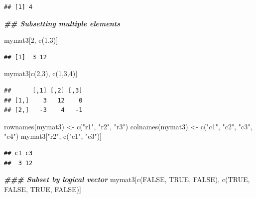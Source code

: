 \documentclass[
]{book}
\newenvironment{Shaded}{\begin{snugshade}}{\end{snugshade}}
\newcommand{\ConstantTok}[1]{\textcolor[rgb]{0.00,0.00,0.00}{#1}}
\newcommand{\DecValTok}[1]{\textcolor[rgb]{0.00,0.00,0.81}{#1}}
\newcommand{\DocumentationTok}[1]{\textcolor[rgb]{0.56,0.35,0.01}{\textbf{\textit{#1}}}}
\newcommand{\FunctionTok}[1]{\textcolor[rgb]{0.00,0.00,0.00}{#1}}
\newcommand{\NormalTok}[1]{#1}
\newcommand{\OtherTok}[1]{\textcolor[rgb]{0.56,0.35,0.01}{#1}}
\newcommand{\StringTok}[1]{\textcolor[rgb]{0.31,0.60,0.02}{#1}}
\begin{document}
\begin{verbatim}
## [1] 4
\end{verbatim}

\begin{Shaded}
\begin{Highlighting}[]
\DocumentationTok{\#\# Subsetting multiple elements}

\NormalTok{mymat3[}\DecValTok{2}\NormalTok{, }\FunctionTok{c}\NormalTok{(}\DecValTok{1}\NormalTok{,}\DecValTok{3}\NormalTok{)]}
\end{Highlighting}
\end{Shaded}

\begin{verbatim}
## [1]  3 12
\end{verbatim}

\begin{Shaded}
\begin{Highlighting}[]
\NormalTok{mymat3[}\FunctionTok{c}\NormalTok{(}\DecValTok{2}\NormalTok{,}\DecValTok{3}\NormalTok{), }\FunctionTok{c}\NormalTok{(}\DecValTok{1}\NormalTok{,}\DecValTok{3}\NormalTok{,}\DecValTok{4}\NormalTok{)]}
\end{Highlighting}
\end{Shaded}

\begin{verbatim}
##      [,1] [,2] [,3]
## [1,]    3   12    0
## [2,]   -3    4   -1
\end{verbatim}

\begin{Shaded}
\begin{Highlighting}[]
\FunctionTok{rownames}\NormalTok{(mymat3) }\OtherTok{\textless{}{-}} \FunctionTok{c}\NormalTok{(}\StringTok{"r1"}\NormalTok{, }\StringTok{"r2"}\NormalTok{, }\StringTok{"r3"}\NormalTok{)}
\FunctionTok{colnames}\NormalTok{(mymat3) }\OtherTok{\textless{}{-}} \FunctionTok{c}\NormalTok{(}\StringTok{"c1"}\NormalTok{, }\StringTok{"c2"}\NormalTok{, }\StringTok{"c3"}\NormalTok{, }\StringTok{"c4"}\NormalTok{)}
\NormalTok{mymat3[}\StringTok{"r2"}\NormalTok{, }\FunctionTok{c}\NormalTok{(}\StringTok{"c1"}\NormalTok{, }\StringTok{"c3"}\NormalTok{)]}
\end{Highlighting}
\end{Shaded}

\begin{verbatim}
## c1 c3 
##  3 12
\end{verbatim}

\begin{Shaded}
\begin{Highlighting}[]
\DocumentationTok{\#\#\# Subset by logical vector}
\NormalTok{mymat3[}\FunctionTok{c}\NormalTok{(}\ConstantTok{FALSE}\NormalTok{, }\ConstantTok{TRUE}\NormalTok{, }\ConstantTok{FALSE}\NormalTok{),}
       \FunctionTok{c}\NormalTok{(}\ConstantTok{TRUE}\NormalTok{, }\ConstantTok{FALSE}\NormalTok{, }\ConstantTok{TRUE}\NormalTok{, }\ConstantTok{FALSE}\NormalTok{)]}
\end{Highlighting}
\end{Shaded}
\end{document}

